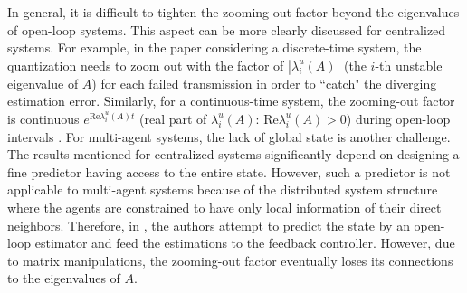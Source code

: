 \documentclass[letterpaper,journal,final,twocolumn]{IEEEtran}
\begin{document}
In general, it is difficult to tighten the zooming-out factor beyond the eigenvalues of open-loop systems. This aspect can be more clearly discussed for centralized systems. For example, in the paper \cite{you2010minimum} considering a discrete-time system, the quantization needs to zoom out with the factor of $|\lambda^u_i(A)|$ (the $i$-th unstable eigenvalue of $A$) for each failed transmission in order to ``catch" the diverging estimation error. Similarly, for a continuous-time system, the zooming-out factor is continuous $e^{\text{Re} \lambda^u_i(A)t}$ (real part of $\lambda^u_i(A)$: Re$\lambda^u_i(A)>0$) during open-loop intervals \cite{feng2020tac}. 
For multi-agent systems, the lack of global state is another challenge. The results mentioned for centralized systems significantly depend on designing a fine predictor having access to the entire state. However, such a predictor is not applicable to multi-agent systems because of the distributed system structure where the agents are constrained to have only local information of their direct neighbors. Therefore, in \cite{feng2020arxiv}, the authors attempt to predict the state by an open-loop estimator and feed the estimations to the feedback controller. However, due to matrix manipulations, the zooming-out factor eventually loses its connections to the eigenvalues of $A$. 
\end{document}
